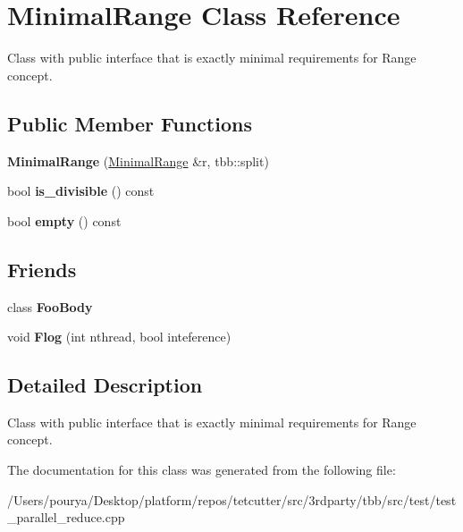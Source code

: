 \hypertarget{classMinimalRange}{}\section{Minimal\+Range Class Reference}
\label{classMinimalRange}


Class with public interface that is exactly minimal requirements for Range concept.  


\subsection*{Public Member Functions}
\begin{DoxyCompactItemize}
\item 
\hypertarget{classMinimalRange_a7327dff8d62eb37517014f20cf4c64fc}{}{\bfseries Minimal\+Range} (\hyperlink{classMinimalRange}{Minimal\+Range} \&r, tbb\+::split)\label{classMinimalRange_a7327dff8d62eb37517014f20cf4c64fc}

\item 
\hypertarget{classMinimalRange_a4d001751208378a400909614bf1f093a}{}bool {\bfseries is\+\_\+divisible} () const \label{classMinimalRange_a4d001751208378a400909614bf1f093a}

\item 
\hypertarget{classMinimalRange_a09c406680f84aeec779bda19fa952020}{}bool {\bfseries empty} () const \label{classMinimalRange_a09c406680f84aeec779bda19fa952020}

\end{DoxyCompactItemize}
\subsection*{Friends}
\begin{DoxyCompactItemize}
\item 
\hypertarget{classMinimalRange_ab6129ce8fbbc102379d689360aab23f8}{}class {\bfseries Foo\+Body}\label{classMinimalRange_ab6129ce8fbbc102379d689360aab23f8}

\item 
\hypertarget{classMinimalRange_a8da9bd0e43bf587c0ebfcbdc6ae60092}{}void {\bfseries Flog} (int nthread, bool inteference)\label{classMinimalRange_a8da9bd0e43bf587c0ebfcbdc6ae60092}

\end{DoxyCompactItemize}


\subsection{Detailed Description}
Class with public interface that is exactly minimal requirements for Range concept. 

The documentation for this class was generated from the following file\+:\begin{DoxyCompactItemize}
\item 
/\+Users/pourya/\+Desktop/platform/repos/tetcutter/src/3rdparty/tbb/src/test/test\+\_\+parallel\+\_\+reduce.\+cpp\end{DoxyCompactItemize}
